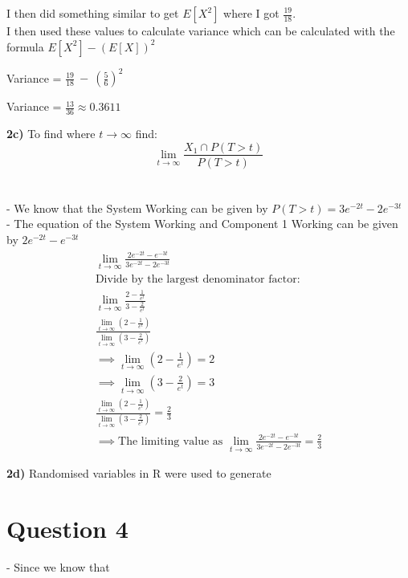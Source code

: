 \documentclass[oneside, a4paper]{article}
\begin{document}
I then did something similar to get $E[X^2]$ where I got $\frac{19}{18}$. \\
I then used these values to calculate variance which can be calculated with the formula $E[X^2] - (E[X])^2$

Variance = $\frac{19}{18}\:-\:\left(\frac{5}{6}\right)^2$

Variance = $\frac{13}{36} \approx 0.3611$

\textbf{2c)} To find where $t \to \infty$ find: 
$$\lim_{t \to \infty} \frac{X_1 \cap P(T>t)}{P(T>t)}$$ \\ \\
- We know that the System Working can be given by $P(T>t) = 3e^{-2t} -2e^{-3t}$ \\
- The equation of the System Working and Component 1 Working can be given by $2e^{-2t} - e^{-3t}$ \\

\begin{equation}
    \begin{split}
        \lim_{t \to \infty} \frac{2e^{-2t} - e^{-3t}}{3e^{-2t} -2e^{-3t}} \\
        \text{Divide by the largest denominator factor:}\\
        \lim_{t \to \infty} \frac{2-\frac{1}{e^t}}{3-\frac{2}{e^t}} \\
        \frac{\lim _{t\to \infty }\left(2-\frac{1}{e^t}\right)}{\lim _{t\to \infty }\left(3-\frac{2}{e^t}\right)} \\ 
        \implies \lim _{t\to \infty }\left(2-\frac{1}{e^t}\right)=2 \\
        \implies \lim _{t\to \infty }\left(3-\frac{2}{e^t}\right)=3 \\ 
        \frac{\lim _{t\to \infty }\left(2-\frac{1}{e^t}\right)}{\lim _{t\to \infty }\left(3-\frac{2}{e^t}\right)} = \frac{2}{3} \\ 
        \implies \text{The limiting value as } \lim_{t \to \infty} \frac{2e^{-2t} - e^{-3t}}{3e^{-2t} -2e^{-3t}} = \frac{2}{3}
    \end{split}
\end{equation}

\textbf{2d)} Randomised variables in R were used to generate 

\newpage


\section{Question 4}
- Since we know that 
\end{document}

